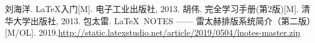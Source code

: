 \begin{thebibliography}{99}
	 刘海洋. \LaTeX 入门[M]. 电子工业出版社, 2013.
	 胡伟. \LaTeXe 完全学习手册(第2版)[M]. 清华大学出版社, 2013.
	 包太雷. \LaTeX\ NOTES —— 雷太赫排版系统简介（第二版）[M/OL]. 2019.\url{http://static.latexstudio.net/article/2019/0504/lnotes-master.zip}
\end{thebibliography}
\newpage